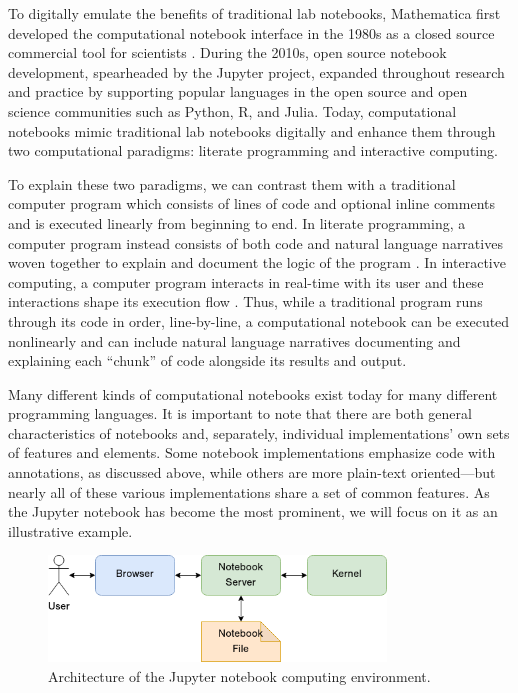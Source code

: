 \documentclass[11pt,letterpaper]{article}
\begin{document}
To digitally emulate the benefits of traditional lab notebooks, Mathematica first developed the computational notebook interface in the 1980s as a closed source commercial tool for scientists \citep{somers_scientific_2018}. During the 2010s, open source notebook development, spearheaded by the Jupyter project, expanded throughout research and practice by supporting popular languages in the open source and open science communities such as Python, R, and Julia. Today, computational notebooks mimic traditional lab notebooks digitally and enhance them through two computational paradigms: literate programming and interactive computing.

To explain these two paradigms, we can contrast them with a traditional computer program which consists of lines of code and optional inline comments and is executed linearly from beginning to end. In literate programming, a computer program instead consists of both code and natural language narratives woven together to explain and document the logic of the program \citep{knuth_literate_1992}. In interactive computing, a computer program interacts in real-time with its user and these interactions shape its execution flow \citep{perez_ipython:_2007}. Thus, while a traditional program runs through its code in order, line-by-line, a computational notebook can be executed nonlinearly and can include natural language narratives documenting and explaining each \enquote{chunk} of code alongside its results and output.

Many different kinds of computational notebooks exist today for many different programming languages. It is important to note that there are both general characteristics of notebooks and, separately, individual implementations' own sets of features and elements. Some notebook implementations emphasize code with annotations, as discussed above, while others are more plain-text oriented---but nearly all of these various implementations share a set of common features. As the Jupyter notebook has become the most prominent, we will focus on it as an illustrative example.

\begin{figure}[tbp]
	\centering
	\includegraphics[width=0.8\textwidth]{notebook-architecture.png}
	\caption{Architecture of the Jupyter notebook computing environment.}
	\label{fig:notebook_architecture}
\end{figure}
\end{document}
